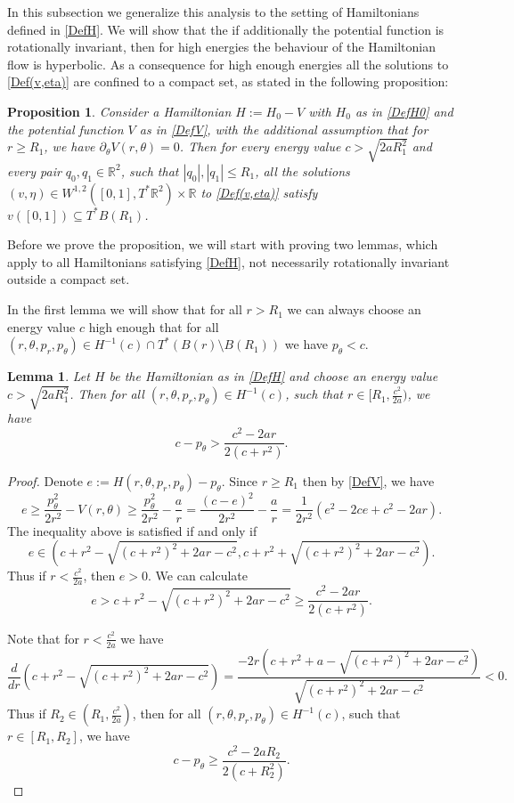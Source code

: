 \documentclass[a4paper]{amsart}
\newtheorem{prop}[thm]{Proposition}%
\newtheorem{lem}[thm]{Lemma}%
\numberwithin{equation}{section}
\newcommand{\R}{\mathbb{R}}
\begin{document}
In this subsection we generalize this analysis to the setting of Hamiltonians defined in \eqref{DefH}.
We will show that the if additionally the potential function is rotationally invariant, then for high energies the behaviour of the Hamiltonian flow is hyperbolic. As a consequence for high enough energies all the solutions to \eqref{Def(v,eta)} are confined to a compact set, as stated in the following proposition:

\begin{prop}\label{prop:RotBound}
Consider a Hamiltonian $H:= H_0-V$ with $H_0$ as in \eqref{DefH0} and the potential function $V$ as in \eqref{DefV}, with the additional assumption that for $r\geq R_1$, we have $\partial_\theta V(r,\theta)=0$. Then for every energy value $c>\sqrt{2aR_1^2}$ and every pair $q_0,q_1 \in \R^2$, such that $|q_0|,|q_1|\leq R_1$, all the solutions $(v,\eta)\in W^{1,2}([0,1], T^*\R^2)\times\R$ to \eqref{Def(v,eta)} satisfy $v([0,1])\subseteq T^*B(R_1)$.
\end{prop}
Before we prove the proposition, we will start with proving two lemmas, which apply to all Hamiltonians satisfying \eqref{DefH}, not necessarily rotationally invariant outside a compact set.

In the first lemma we will show that for all $r>R_1$ we can always choose an energy value $c$ high enough that for all $(r, \theta, p_r, p_\theta)\in H^{-1}(c)\cap T^*(B(r)\setminus B(R_1))$ we have $p_\theta<c$. 

\begin{lem}\label{lem:energy}
Let $H$ be the Hamiltonian as in \eqref{DefH} and choose an energy value $c> \sqrt{2aR_1^2} $. Then for all $(r,\theta, p_r, p_\theta)\in H^{-1}(c)$, such that $r\in [R_1, \frac{c^2}{2a})$, we have
$$
c-p_\theta>\frac{c^2-2ar}{2(c+r^2)}.
$$
\end{lem}
\begin{proof}
Denote $e:=H(r,\theta, p_r, p_\theta)-p_\theta$. Since $r\geq R_1$ then by \eqref{DefV}, we have
$$
e \geq \frac{p_\theta^2}{2 r^2}-V(r,\theta)\geq \frac{p_\theta^2}{2 r^2}-\frac{a}{r}= \frac{(c-e)^2}{2 r^2}-\frac{a}{r}=\frac{1}{2r^2}\left(e^2-2ce+c^2-2ar \right).
$$
The inequality above is satisfied if and only if
$$
e \in \left(c+r^2- \sqrt{(c+r^2)^2+2ar-c^2}, c+r^2+ \sqrt{(c+r^2)^2+2ar-c^2}\right).
$$
Thus if $r<\frac{c^2}{2a}$, then $e> 0$. We can calculate
$$
e > c+r^2- \sqrt{(c+r^2)^2+2ar-c^2} \geq \frac{c^2-2ar}{2(c+r^2)}.
$$

Note that for $r<\frac{c^2}{2a}$ we have
$$
\frac{d}{dr}\left(c+r^2- \sqrt{(c+r^2)^2+2ar-c^2}\right)=\frac{-2r\left(c+r^2+a-\sqrt{(c+r^2)^2+2ar-c^2} \right)}{\sqrt{(c+r^2)^2+2ar-c^2}}<0.
$$
Thus if $R_2\in \left(R_1,\frac{c^2}{2a}\right)$, then for all $(r,\theta, p_r, p_\theta)\in H^{-1}(c)$, such that $r\in [R_1, R_2]$, we have
$$
c-p_\theta\geq \frac{c^2-2aR_2}{2(c+R_2^2)}.
$$
\end{proof}
\end{document}
